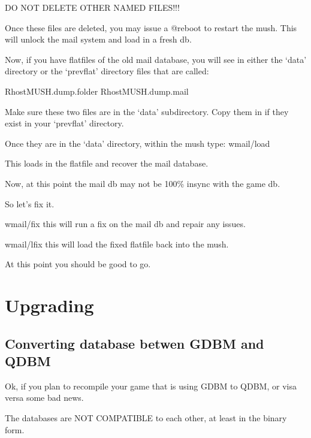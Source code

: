 \documentclass[letterpaper,10pt,english]{sphinxmanual}
\begin{document}
\sphinxAtStartPar
DO NOT DELETE OTHER NAMED FILES!!!

\sphinxAtStartPar
Once these files are deleted, you may issue a @reboot to restart the mush.
This will unlock the mail system and load in a fresh db.

\sphinxAtStartPar
Now, if you have flatfiles of the old mail database, you will see in either
the ‘data’ directory or the ‘prevflat’ directory files that are called:

\sphinxAtStartPar
RhostMUSH.dump.folder
RhostMUSH.dump.mail

\sphinxAtStartPar
Make sure these two files are in the ‘data’ subdirectory.  Copy them in
if they exist in your ‘prevflat’ directory.

\sphinxAtStartPar
Once they are in the ‘data’ directory, within the mush type: wmail/load

\sphinxAtStartPar
This loads in the flatfile and recover the mail database.

\sphinxAtStartPar
Now, at this point the mail db may not be 100\% in\sphinxhyphen{}sync with the game db.

\sphinxAtStartPar
So let’s fix it.

\sphinxAtStartPar
wmail/fix   \textendash{} this will run a fix on the mail db and repair any issues.

\sphinxAtStartPar
wmail/lfix  \textendash{} this will load the fixed flatfile back into the mush.

\sphinxAtStartPar
At this point you should be good to go.


\section{Upgrading}
\label{\detokenize{upgrade:upgrading}}\label{\detokenize{upgrade::doc}}

\subsection{Converting database betwen GDBM and QDBM}
\label{\detokenize{upgrade:converting-database-betwen-gdbm-and-qdbm}}
\sphinxAtStartPar
Ok, if you plan to recompile your game that is using GDBM to QDBM, or visa versa
some bad news.

\sphinxAtStartPar
The databases are NOT COMPATIBLE to each other, at least in the binary form.
\end{document}
